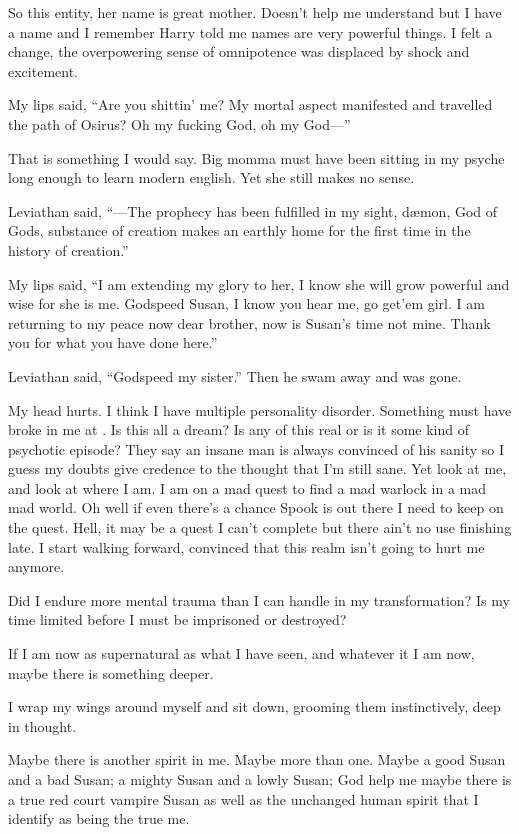 So this entity, her name is great mother. Doesn't help me understand but I have a name and I remember Harry told me names are very powerful things. I felt a change, the overpowering sense of omnipotence was displaced by shock and excitement.

My lips said, ``Are you shittin' me? My mortal aspect manifested and travelled the path of Osirus? Oh my fucking God, oh my God---''

That is something I would say. Big momma must have been sitting in my psyche long enough to learn modern english. Yet she still makes no sense.

Leviathan said, ``---The prophecy has been fulfilled in my sight, d\ae mon, God of Gods, substance of creation makes an earthly home for the first time in the history of creation.''

My lips said, ``I am extending my glory to her, I know she will grow powerful and wise for she is me. Godspeed Susan, I know you hear me, go get'em girl. I am returning to my peace now dear brother, now is Susan's time not mine. Thank you for what you have done here.''

Leviathan said, ``Godspeed my sister.'' Then he swam away and was gone.

\parasep

My head hurts. I think I have multiple personality disorder. Something must have broke in me at \chichenitza*. Is this all a dream? Is any of this real or is it some kind of psychotic episode? They say an insane man is always convinced of his sanity so I guess my doubts give credence to the thought that I'm still sane. Yet look at me, and look at where I am. I am on a mad quest to find a mad warlock in a mad mad world. Oh well if even there's a chance Spook is out there I need to keep on the quest. Hell, it may be a quest I can't complete but there ain't no use finishing late. I start walking forward, convinced that this realm isn't going to hurt me anymore.

Did I endure more mental trauma than I can handle in my transformation? Is my time limited before I must be imprisoned or destroyed?

If I am now as supernatural as what I have seen, and whatever it I am now, maybe there is something deeper. 

I wrap my wings around myself and sit down, grooming them instinctively, deep in thought.

Maybe there is another spirit in me. Maybe more than one. Maybe a good Susan and a bad Susan; a mighty Susan and a lowly Susan; God help me maybe there is a true red court vampire Susan as well as the unchanged human spirit that I identify as being the true me.

